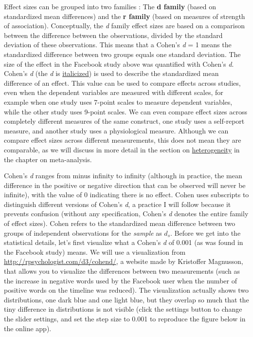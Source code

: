 \documentclass[
  oneside]{book}
\begin{document}
Effect sizes can be grouped into two families \citep{rosenthal_contrasts_2000}: The \textbf{d family} (based on standardized mean differences) and the \textbf{r family} (based on measures of strength of association). Conceptually, the \emph{d} family effect sizes are based on a comparison between the difference between the observations, divided by the standard deviation of these observations. This means that a Cohen's \emph{d} = 1 means the standardized difference between two groups equals one standard deviation. The size of the effect in the Facebook study above was quantified with Cohen's \emph{d}. Cohen's \emph{d} (the \emph{d} is \href{https://blog.apastyle.org/apastyle/2011/08/the-grammar-of-mathematics-writing-about-variables.html}{italicized}) is used to describe the standardized mean difference of an effect. This value can be used to compare effects across studies, even when the dependent variables are measured with different scales, for example when one study uses 7-point scales to measure dependent variables, while the other study uses 9-point scales. We can even compare effect sizes across completely different measures of the same construct, one study uses a self-report measure, and another study uses a physiological measure. Although we can compare effect sizes across different measurements, this does not mean they are comparable, as we will discuss in more detail in the section on \protect\hyperlink{heterogeneity}{heterogeneity} in the chapter on meta-analysis.

Cohen's \emph{d} ranges from minus infinity to infinity (although in practice, the mean difference in the positive or negative direction that can be observed will never be infinite), with the value of 0 indicating there is no effect. Cohen \citeyearpar{cohen_statistical_1988} uses subscripts to distinguish different versions of Cohen's \emph{d}, a practice I will follow because it prevents confusion (without any specification, Cohen's \emph{d} denotes the entire family of effect sizes). Cohen refers to the standardized mean difference between two groups of independent observations for the \emph{sample} as \(d_s\). Before we get into the statistical details, let's first visualize what a Cohen's \emph{d} of 0.001 (as was found in the Facebook study) means. We will use a visualization from \url{http://rpsychologist.com/d3/cohend/}, a website made by Kristoffer Magnusson, that allows you to visualize the differences between two measurements (such as the increase in negative words used by the Facebook user when the number of positive words on the timeline was reduced). The visualization actually shows two distributions, one dark blue and one light blue, but they overlap so much that the tiny difference in distributions is not visible (click the settings button to change the slider settings, and set the step size to 0.001 to reproduce the figure below in the online app).
\end{document}
